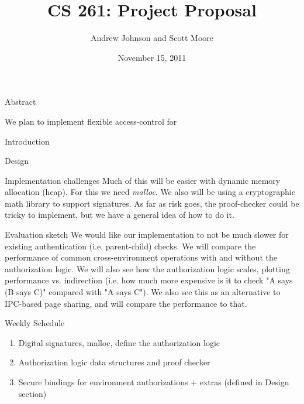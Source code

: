 \documentclass[10pt]{article}
\begin{document}
\title{CS 261: Project Proposal}
\author{Andrew Johnson and Scott Moore}
\date{November 15, 2011}

\maketitle

\thispagestyle{empty}

\begin{comment}

\begin{problem}{Problem Title}
Problem Statement
\newline\newline
\textbf{\emph{Solution}}:
\newline\newline
Solution goes here
\end{problem}

\end{comment}

\begin{section}{Abstract}

We plan to implement flexible access-control for 

\end{section}

\begin{section}{Introduction}
\end{section}

\begin{section}{Design}
\end{section}

\begin{section}{Implementation challenges}
Much of this will be easier with dynamic memory allocation (heap).  
For this we need \emph{malloc}.  
We also will be using a cryptographic math library to support signatures. 
As far as risk goes, the proof-checker could be tricky to implement, but we have a general idea of how to do it.
\end{section}

\begin{section}{Evaluation sketch}
We would like our implementation to not be much slower for existing authentication (i.e. parent-child) checks.  
We will compare the performance of common cross-environment operations with and without the authorization logic.  
We will also see how the authorization logic scales, plotting performance vs. indirection (i.e. how much more expensive is it to check "A says (B says C)" compared with "A says C").
We also see this as an alternative to IPC-based page sharing, and will compare the performance to that.
\end{section}

\begin{section}{Weekly Schedule}
\begin{enumerate}
\item Digital signatures, malloc, define the authorization logic
\item Authorization logic data structures and proof checker
\item Secure bindings for environment authorizations + extras (defined in Design section)
\end{enumerate}
\end{section}
\end{document}
